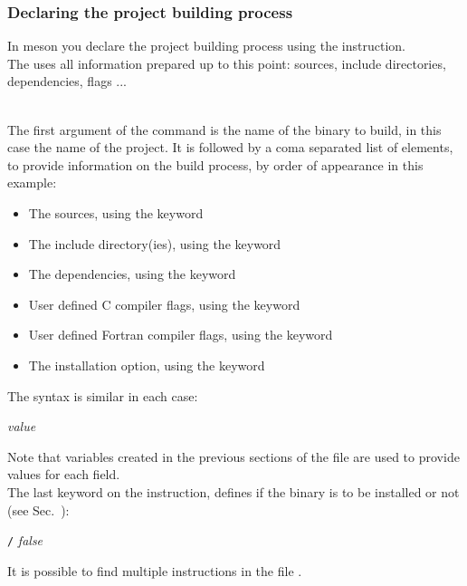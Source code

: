 \subsubsection*{Declaring the project building process}
\label{build_rules_meson}

In meson you declare the project building process using the  instruction. \\
The  uses all information prepared up to this point: sources, include directories, dependencies, flags ... 
\begin{script}
\end{script}
\\[-0.5cm]
\noindent The first argument of the command is the name of the binary to build, in this case the name of the project.  
It is followed by a coma separated list of elements, to provide information on the build process, by order of appearance in this example:
\begin{itemize}
\item The sources, using the keyword 
\item The include directory(ies), using the keyword  
\item The dependencies, using the keyword 
\item User defined C compiler flags, using the keyword 
\item User defined Fortran compiler flags, using the keyword 
\item The installation option, using the keyword 
\end{itemize}
The syntax is similar in each case:
\begin{center}\em{value}\end{center}
\noindent Note that variables created in the previous sections of the file  are used to provide values for each field.  \\
The last keyword on the  instruction, defines if the binary is to be installed or not (see Sec.~{}):
\begin{center} \texttt{/} {\em{false}}\end{center}
\noindent It is possible to find multiple  instructions in the file . 

